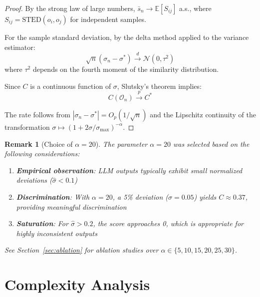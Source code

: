 \documentclass{article}
\newtheorem{remark}[theorem]{Remark}
\begin{document}
\begin{proof}
By the strong law of large numbers, $\bar{s}_n \to \mathbb{E}[S_{ij}]$ a.s., where $S_{ij} = \text{STED}(o_i, o_j)$ for independent samples.

For the sample standard deviation, by the delta method applied to the variance estimator:
\begin{equation}
    \sqrt{n}(\sigma_n - \sigma^*) \xrightarrow{d} \mathcal{N}(0, \tau^2)
\end{equation}
where $\tau^2$ depends on the fourth moment of the similarity distribution.

Since $C$ is a continuous function of $\sigma$, Slutsky's theorem implies:
\begin{equation}
    C(\mathcal{O}_n) \xrightarrow{p} C^*
\end{equation}

The rate follows from $|\sigma_n - \sigma^*| = O_p(1/\sqrt{n})$ and the Lipschitz continuity of the transformation $\sigma \mapsto (1 + 2\sigma/\sigma_{\max})^{-\alpha}$.
\end{proof}

\begin{remark}[Choice of $\alpha = 20$]
The parameter $\alpha = 20$ was selected based on the following considerations:
\begin{enumerate}
    \item \textbf{Empirical observation}: LLM outputs typically exhibit small normalized deviations ($\hat{\sigma} < 0.1$)
    \item \textbf{Discrimination}: With $\alpha = 20$, a 5\% deviation ($\hat{\sigma} = 0.05$) yields $C \approx 0.37$, providing meaningful discrimination
    \item \textbf{Saturation}: For $\hat{\sigma} > 0.2$, the score approaches 0, which is appropriate for highly inconsistent outputs
\end{enumerate}
See Section~\ref{sec:ablation} for ablation studies over $\alpha \in \{5, 10, 15, 20, 25, 30\}$.
\end{remark}

\section{Complexity Analysis}
\end{document}
